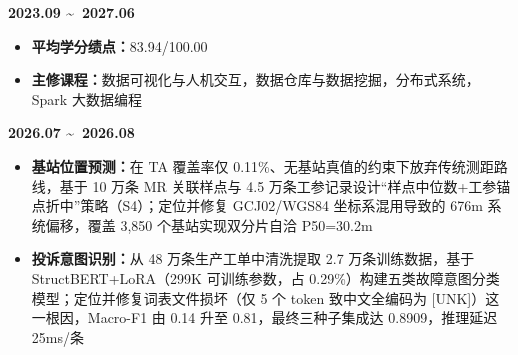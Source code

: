 \documentclass[UTF8,AutoFakeBold]{resume}
\begin{document}
\gapEntry


{\textbf{2023.09 \textasciitilde \ 2027.06}}

\begin{itemize}
    \item \kaishu\textbf{平均学分绩点：}83.94/100.00
    \item \kaishu\textbf{主修课程：}数据可视化与人机交互，数据仓库与数据挖掘，分布式系统，Spark 大数据编程
\end{itemize}

{\textbf{2026.07 \textasciitilde \ 2026.08}}
\begin{itemize}
    \item \kaishu \textbf{基站位置预测：}在 TA 覆盖率仅 0.11\%、无基站真值的约束下放弃传统测距路线，基于 10 万条 MR 关联样点与 4.5 万条工参记录设计“样点中位数+工参锚点折中”策略（S4）；定位并修复 GCJ02/WGS84 坐标系混用导致的 676m 系统偏移，覆盖 3,850 个基站实现双分片自洽 P50=30.2m
    \item \kaishu \textbf{投诉意图识别：}从 48 万条生产工单中清洗提取 2.7 万条训练数据，基于 StructBERT+LoRA（299K 可训练参数，占 0.29\%）构建五类故障意图分类模型；定位并修复词表文件损坏（仅 5 个 token 致中文全编码为 [UNK]）这一根因，Macro-F1 由 0.14 升至 0.81，最终三种子集成达 0.8909，推理延迟 25ms/条
\end{itemize}
\end{document}
